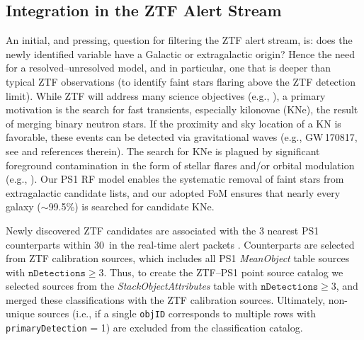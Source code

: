 \documentclass[twocolumn]{aastex62}
\begin{document}
\begin{CJK*}{UTF8}{gbsn}
\subsection{Integration in the ZTF Alert Stream}

An initial, and pressing, question for filtering the ZTF alert stream, is:
does the newly identified variable have a Galactic or extragalactic origin?
Hence the need for a resolved--unresolved model, and in particular, one that
is deeper than typical ZTF observations (to identify faint stars flaring
above the ZTF detection limit). While ZTF will address many science
objectives (e.g., \citealt{Graham:18:ZTF}), a primary motivation is the
search for fast transients, especially kilonovae (KNe), the result of
merging binary neutron stars. If the proximity and sky location of a KN is
favorable, these events can be detected via gravitational waves (e.g.,
GW\,170817, see \citealt{Abbott17} and references therein). The search for
KNe is plagued by significant foreground contamination in the form of
stellar flares and/or orbital modulation (e.g., \citealt{Kulkarni06,
Berger12, Kasliwal16}). Our PS1 RF model enables the systematic removal of
faint stars from extragalactic candidate lists, and our adopted FoM ensures
that nearly every galaxy ($\sim$99.5\%) is searched for candidate KNe.

Newly discovered ZTF candidates are associated with the 3 nearest PS1
counterparts within 30\arcsec\ in the real-time alert packets
\citep{Masci:18:ZTF}. Counterparts are selected from ZTF calibration
sources, which includes all PS1 \textit{MeanObject} table sources with
$\mathtt{nDetections} \ge 3$. Thus, to create the ZTF--PS1 point source
catalog we selected sources from the \textit{StackObjectAttributes} table
with $\mathtt{nDetections} \ge 3$, and merged these classifications with the
ZTF calibration sources. Ultimately, non-unique sources (i.e., if a single
\texttt{objID} corresponds to multiple rows with \texttt{primaryDetection} =
1) are excluded from the classification catalog.


\end{CJK*}
\end{document}
